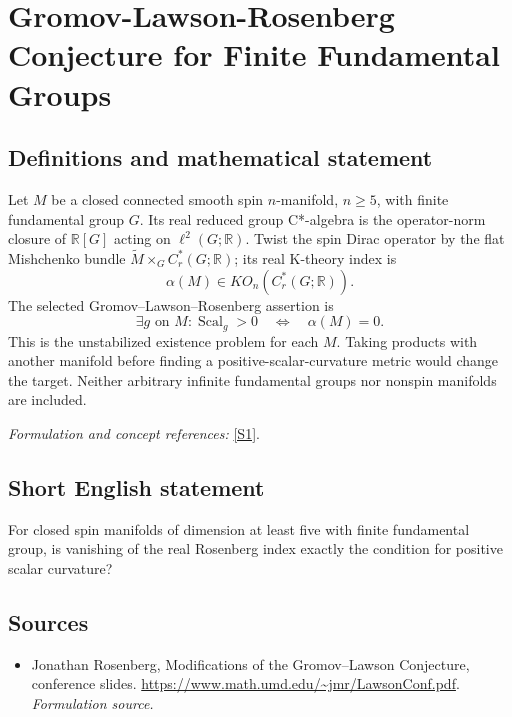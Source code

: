 \documentclass[11pt]{article}
\begin{document}
\section*{\texorpdfstring{Gromov-Lawson-Rosenberg Conjecture for Finite Fundamental Groups}{Gromov-Lawson-Rosenberg Conjecture for Finite Fundamental Groups}}\label{30006906}
\subsection{Definitions and mathematical statement}
Let $M$ be a closed connected smooth spin $n$-manifold, $n\ge5$, with finite fundamental group $G$. Its real reduced group C*-algebra is the operator-norm closure of ${\mathbb{R}}[G]$ acting on $\ell^2(G;{\mathbb{R}})$. Twist the spin Dirac operator by the flat Mishchenko bundle $\widetilde M\times_G C_r^*(G;{\mathbb{R}})$; its real K-theory index is
\[
 \alpha(M)\in KO_n(C_r^*(G;{\mathbb{R}})).
\]
The selected Gromov--Lawson--Rosenberg assertion is
\[
 \exists g\text{ on }M:\operatorname{Scal}_g>0
 \quad\Longleftrightarrow\quad\alpha(M)=0.
\]
This is the unstabilized existence problem for each $M$. Taking products with another manifold before finding a positive-scalar-curvature metric would change the target. Neither arbitrary infinite fundamental groups nor nonspin manifolds are included.
\par\smallskip\textit{Formulation and concept references:} \href{https://www.math.umd.edu/~jmr/LawsonConf.pdf}{[S1]}.

\subsection{Short English statement}
For closed spin manifolds of dimension at least five with finite fundamental group, is vanishing of the real Rosenberg index exactly the condition for positive scalar curvature?
\subsection{Sources}
\begin{itemize}
\item[S1]Jonathan Rosenberg, Modifications of the Gromov–Lawson Conjecture, conference slides.
\url{https://www.math.umd.edu/~jmr/LawsonConf.pdf}.
\textit{Formulation source.}
\end{itemize}
\end{document}
